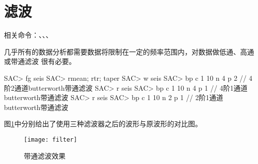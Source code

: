 \section{滤波}
相关命令：、、、

几乎所有的数据分析都需要数据将限制在一定的频率范围内，对数据做低通、高通或带通滤波
很有必要。

\begin{SACCode}
SAC> fg seis
SAC> rmean; rtr; taper
SAC> w seis
SAC> bp c 1 10 n 4 p 2  // 4阶2通道butterworth带通滤波
SAC> r seis
SAC> bp c 1 10 n 4 p 1  // 4阶1通道butterworth带通滤波
SAC> r seis
SAC> bp c 1 10 n 2 p 1  // 2阶1通道butterworth带通滤波
\end{SACCode}

图\ref{fig:filter}中分别给出了使用三种滤波器之后的波形与原波形的对比图。

\begin{figure}[H]
\centering
\texttt{[image: filter]}
\caption{带通滤波效果}
\label{fig:filter}
\end{figure}
